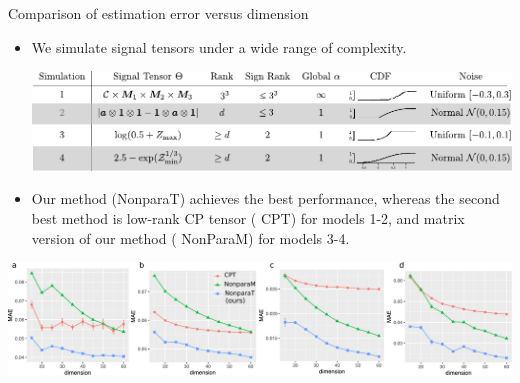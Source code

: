 \documentclass[10pt, mathserif]{beamer} %
\theoremstyle{definition}
\theoremstyle{plain}
\begin{document}
\begin{frame}{Comparison of estimation error versus dimension}

    \begin{itemize}
\item We simulate signal tensors under a wide range of complexity.    

       \begin{center}
        \includegraphics[width = \textwidth]{Figures/simulation_new.pdf}
        \end{center}

\pause
    \item Our method ({\color{blue}NonparaT}) achieves the best performance, whereas the second best method is low-rank CP tensor ({\color{red} CPT}) for models 1-2, and matrix version of our method ({\color{darkgreen} NonParaM}) for models 3-4.
  \end{itemize}
    
          \begin{center}
    \includegraphics[width =\textwidth]{Figures/fig1-4v2.pdf}
    \end{center}
    
        
\end{frame}
\end{document}

